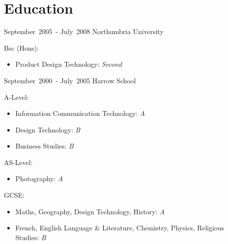 \newcommand{\indentitem}{\setlength\itemindent{25pt}}

\section{Education}

\cventry %
{\mbox{September 2005 -} \mbox{July 2008}}
{Northumbria University}
{}{}{}
  {Bsc (Hons):
   \begin{itemize}
   \indentitem \item Product Design Technology: \textit{Second}
   \end{itemize}
  }

\cventry %
{\mbox{September 2000 -} \mbox{July 2005}}
{Harrow School}
{}{}{}
  {A-Level:
   \begin{itemize}
    \indentitem \item Information Communication Technology: \textit{A} 
    \indentitem \item Design Technology: \textit{B} 
    \indentitem \item Business Studies: \textit{B}
   \end{itemize}
   AS-Level:
   \begin{itemize}
    \indentitem \item Photography: \textit{A}
   \end{itemize}
   GCSE:
   \begin{itemize}
    \indentitem \item Maths, Geography, Design Technology, History: \textit{A}
    \indentitem \item French, English Language \& Literature, Chemistry, Physics, Religious Studies: \textit{B} 
   \end{itemize}
  }

\closesection{}
